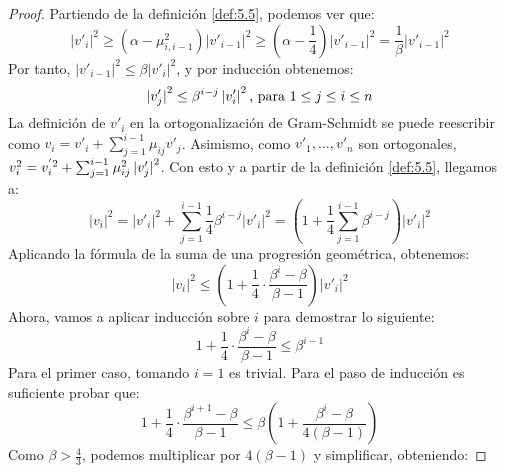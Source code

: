     \begin{proof}
        Partiendo de la definición \ref{def:5.5}, podemos ver que:
        \begin{equation}
            \left| v'_{i} \right|^{2} \geq (\alpha - \mu_{i,i-1}^{2}) \left| v'_{i-1} \right|^{2} \geq (\alpha - \frac{1}{4})\left| v'_{i-1} \right|^{2} = \frac{1}{\beta} \left| v'_{i-1} \right|^{2}
        \end{equation}
        Por tanto, $\left| v'_{i-1} \right|^{2} \leq \beta \left| v'_{i} \right|^{2}$, y por inducción obtenemos:
        \begin{equation} \label{eq:5.1}
            \left| \smash[b]{v'_{j}} \right|^{2} \leq \beta^{i-j} \left| v'_{i} \right|^{2} \text{, para } 1 \leq j \leq i \leq n
        \end{equation}
        La definición de $v'_{i}$ en la ortogonalización de Gram-Schmidt se puede reescribir como $v_{i} = v'_{i} + \sum_{j=1}^{i-1} \mu_{ij}v'_{j}$. Asimismo, como $v'_{1}, ... , v'_{n}$ son ortogonales, $v_{i}^{2} = v_{i}^{'2} + \sum_{j=1}^{i-1} \mu_{ij}^{2} \left| \smash[b]{v'_{j}} \right|^{2}$. Con esto y a partir de la definición \ref{def:5.5}, llegamos a:
        \begin{equation}
            \left| v_{i} \right|^{2} = \left| v'_{i} \right|^{2} + \sum_{j=1}^{i-1} \frac{1}{4}\beta^{i-j} \left| v'_{i} \right|^{2} = (1 + \frac{1}{4} \sum_{j=1}^{i-1} \beta^{i-j}) \left| v'_{i} \right|^{2}
        \end{equation}
        Aplicando la fórmula de la suma de una progresión geométrica, obtenemos:
        \begin{equation}
            \left| v_{i} \right|^{2} \leq (1 + \frac{1}{4} \cdot \frac{\beta^{i} - \beta}{\beta - 1}) \left| v'_{i} \right|^{2}
        \end{equation}
        Ahora, vamos a aplicar inducción sobre $i$ para demostrar lo siguiente:
        \begin{equation}
            1 + \frac{1}{4} \cdot \frac{\beta^{i} - \beta}{\beta - 1} \leq \beta^{i-1}
        \end{equation}
        Para el primer caso, tomando $i=1$ es trivial. Para el paso de inducción es suficiente probar que:
        \begin{equation}
            1 + \frac{1}{4} \cdot \frac{\beta^{i+1} - \beta}{\beta - 1} \leq \beta (1 + \frac{\beta^{i} - \beta}{4(\beta - 1)})
        \end{equation}
        Como $\beta > \frac{4}{3}$, podemos multiplicar por $4(\beta-1)$ y simplificar, obteniendo:

\end{proof}
